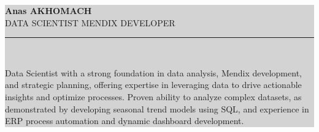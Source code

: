 \documentclass[9pt, a4paper]{extarticle}
\begin{document}
\noindent
\colorbox{lightgray}{%
\begin{minipage}[c]{\dimexpr\textwidth-2\fboxsep\relax}
    \vspace{2mm}
    \begin{minipage}[c]{0.17\textwidth}
        \centering
    \end{minipage}%
    \hspace{0.05\textwidth}%
    \begin{minipage}[c]{0.75\textwidth}
        \centering
        \vspace*{\fill}
        {\Huge\bfseries\color{headerblue}Anas AKHOMACH}\\[0.5em]
        {\large\color{headerblue}DATA SCIENTIST \textperiodcentered MENDIX DEVELOPER}\\[1em]
        \textcolor{headerblue}{\rule{10cm}{2pt}}\\[1em]
        \begin{minipage}{14.5cm}
            \centering
            {\small\color{bodycolor}Data Scientist with a strong foundation in data analysis, Mendix development, and strategic planning, offering expertise in leveraging data to drive actionable insights and optimize processes. Proven ability to analyze complex datasets, as demonstrated by developing seasonal trend models using SQL, and experience in ERP process automation and dynamic dashboard development.}
        \end{minipage}
        \vspace*{\fill}
    \end{minipage}
     \vspace{2mm}
\end{minipage}%
}
\vspace{5mm}
\end{document}

